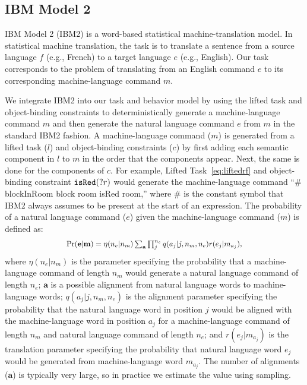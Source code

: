 \documentclass[conference]{IEEEtran}
\newcommand*{\Scale}[2][4]{\scalebox{#1}{$#2$}}%
\begin{document}
\subsection{IBM Model 2}

IBM Model 2 (IBM2) \cite{brown90,brown93} is a word-based statistical machine-translation model. In statistical machine translation, the task is to translate a sentence from a source language $f$ (e.g., French) to a target language $e$ (e.g., English). Our task corresponds to the problem of translating from an English command $e$ to its corresponding machine-language command $m$. 

We integrate IBM2 into our task and behavior model by using the lifted task and object-binding constraints to deterministically generate a machine-language command $m$ and then generate the natural language command $e$ from $m$ in the standard IBM2 fashion. 
A machine-language command ($m$) is generated from a lifted task ($l$) and object-binding constraints ($c$) by first adding each semantic component in $l$
to $m$ in the order that the components appear. Next, the same is done for the components of $c$. For example, Lifted Task~\ref{eq:liftedrf} and object-binding constraint ${\tt isRed}(?r)$ would generate the machine-language command ``\# blockInRoom block room isRed room,'' where \# is the constant symbol that IBM2 always assumes to be present at the start of an expression. The probability of a natural language command ($e$) given the machine-language command ($m$) is defined as:
\begin{equation}
\Scale[0.9]{
\Pr({\mathbf e} | {\mathbf m}) = \eta(n_e | n_m) \sum_{\mathbf a} \prod_j^{n_e} q(a_j | j, n_m, n_e) r(e_j | m_{a_j}),
}
\end{equation}
\noindent where $\eta(n_e | n_m)$ is the parameter specifying the probability that a machine-language command of length $n_m$ %
would generate a natural language command of length $n_e$; %
${\mathbf a}$ is a possible alignment from natural language words to machine-language words; $q(a_j | j, n_m, n_e)$ is the alignment parameter specifying the probability that the natural language word in position $j$ would be aligned with the machine-language word in position $a_j$ for a machine-language command of length $n_m$ and natural language command of length $n_e$;  and $r(e_j | m_{a_j})$ is the translation parameter specifying the probability that natural language word $e_j$ would be generated from machine-language word $m_{a_j}$. The number of alignments (${\mathbf a}$) is typically very large, so in practice we estimate the value using sampling. 
 
\end{document}
